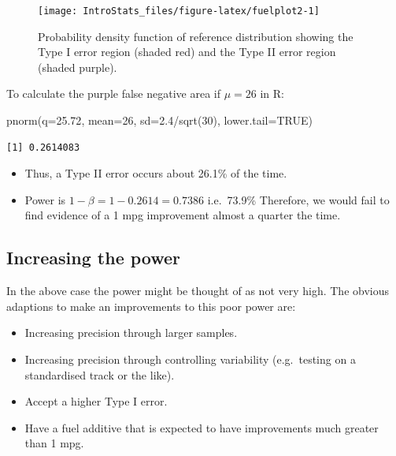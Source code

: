 \documentclass[
  oneside]{krantz}
\newenvironment{Shaded}{\begin{snugshade}}{\end{snugshade}}
\newcommand{\AttributeTok}[1]{\textcolor[rgb]{0.77,0.63,0.00}{#1}}
\newcommand{\ConstantTok}[1]{\textcolor[rgb]{0.00,0.00,0.00}{#1}}
\newcommand{\DecValTok}[1]{\textcolor[rgb]{0.00,0.00,0.81}{#1}}
\newcommand{\FloatTok}[1]{\textcolor[rgb]{0.00,0.00,0.81}{#1}}
\newcommand{\FunctionTok}[1]{\textcolor[rgb]{0.00,0.00,0.00}{#1}}
\newcommand{\NormalTok}[1]{#1}
\newcommand{\SpecialCharTok}[1]{\textcolor[rgb]{0.00,0.00,0.00}{#1}}
\providecommand{\tightlist}{%
  \setlength{\itemsep}{0pt}\setlength{\parskip}{0pt}}
\begin{document}
\begin{figure}

{\centering \texttt{[image: IntroStats\_files/figure-latex/fuelplot2-1]} 

}

\caption{Probability density function of reference distribution showing the Type I error region (shaded red) and the Type II error region (shaded purple).}\label{fig:fuelplot2}
\end{figure}

To calculate the purple false negative area if \(\mu = 26\) in R:

\begin{Shaded}
\begin{Highlighting}[]
\FunctionTok{pnorm}\NormalTok{(}\AttributeTok{q=}\FloatTok{25.72}\NormalTok{, }\AttributeTok{mean=}\DecValTok{26}\NormalTok{, }\AttributeTok{sd=}\FloatTok{2.4}\SpecialCharTok{/}\FunctionTok{sqrt}\NormalTok{(}\DecValTok{30}\NormalTok{), }\AttributeTok{lower.tail=}\ConstantTok{TRUE}\NormalTok{)}
\end{Highlighting}
\end{Shaded}

\begin{verbatim}
[1] 0.2614083
\end{verbatim}

\begin{itemize}
\tightlist
\item
  Thus, a Type II error occurs about 26.1\% of the time.
\item
  Power is \(1-\beta = 1 - 0.2614 = 0.7386\) i.e.~73.9\%
  Therefore, we would fail to find evidence of a 1 mpg improvement almost a quarter the time.
\end{itemize}

\hypertarget{increasing-the-power}{%
\subsection{Increasing the power}\label{increasing-the-power}}

In the above case the power might be thought of as not very high. The obvious adaptions to make an improvements to this poor power are:

\begin{itemize}
\tightlist
\item
  Increasing precision through larger samples.
\item
  Increasing precision through controlling variability (e.g.~testing on a standardised track or the like).
\item
  Accept a higher Type I error.
\item
  Have a fuel additive that is expected to have improvements much greater than 1 mpg.
\end{itemize}
\end{document}
